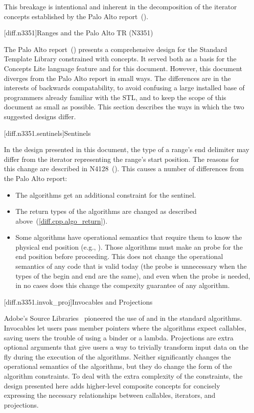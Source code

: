 \pnum
This breakage is intentional and inherent in the decomposition of the iterator concepts established
by the Palo Alto report~(\cite{palo-alto}).

[diff.n3351]{Ranges and the Palo Alto TR (N3351)}

\pnum
The Palo Alto report~(\cite{palo-alto}) presents a comprehensive design for the Standard Template
Library constrained with concepts. It served both as a basis for the Concepts Lite language feature
and for this document. However, this document diverges from the Palo Alto report in small ways. The
differences are in the interests of backwards compatability, to avoid confusing a large installed
base of programmers already familiar with the STL, and to keep the scope of this document as small
as possible. This section describes the ways in which the two suggested designs differ.

[diff.n3351.sentinels]{Sentinels}

\pnum
In the design presented in this document, the type of a range's end delimiter may differ from the
iterator representing the range's start position. The reasons for this change are described in
N4128~(\cite{niebler2014}). This causes a number of differences from the Palo Alto report:

\begin{itemize}
\item The algorithms get an additional constraint for the sentinel.
\item The return types of the algorithms are changed as described above~(\ref{diff.cpp.algo_return}).
\item Some algorithms have operational semantics that require them to know the
physical end position (e.g., ). Those algorithms must make an  probe for
the end position before proceeding. This does not change the operational semantics of any code that
is valid today (the probe is unnecessary when the types of the begin and end are the
same), and even when the probe is needed, in no cases does this change the compexity guarantee of
any algorithm.
\end{itemize}

[diff.n3351.invok_proj]{Invocables and Projections}

\pnum
Adobe's Source Libraries~\cite{ASL} pioneered the use of  and
 in the standard algorithms. Invocables let users pass member pointers
where the algorithms expect callables, saving users the trouble of using a binder or a lambda.
Projections are extra optional arguments that give users a way to trivially transform input data
on the fly during the execution of the algorithms. Neither significantly changes the operational
semantics of the algorithms, but they do change the form of the algorithm constraints. To deal with
the extra complexity of the constraints, the design presented here adds higher-level composite
concepts for concisely expressing the necessary relationships between callables, iterators, and
projections.

